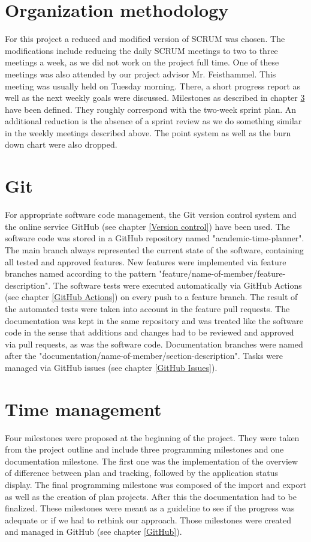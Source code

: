 \section{Organization methodology}
For this project a reduced and modified version of SCRUM \cite{scrum_url} was chosen. The modifications include reducing the daily SCRUM meetings to two to three meetings a week, as we did not work on the project full time. One of these meetings was also attended by our project advisor Mr. Feisthammel. This meeting was usually held on Tuesday morning. There, a short progress report as well as the next weekly goals were discussed. Milestones as described in chapter \ref{Time management} have been defined. They roughly correspond with the two-week sprint plan. An additional reduction is the absence of a sprint review as we do something similar in the weekly meetings described above. The point system as well as the burn down chart were also dropped.

\section{Git}
For appropriate software code management, the Git version control system and the online service GitHub (see chapter \ref{Version control}) have been used. The software code was stored in a GitHub repository named "academic-time-planner". The main branch always represented the current state of the software, containing all tested and approved features. New features were implemented via feature branches named according to the pattern "feature/name-of-member/feature-description". The software tests were executed automatically via GitHub Actions (see chapter \ref{GitHub Actions}) on every push to a feature branch. The result of the automated tests were taken into account in the feature pull requests. The documentation was kept in the same repository and was treated like the software code in the sense that additions and changes had to be reviewed and approved via pull requests, as was the software code. Documentation branches were named after the "documentation/name-of-member/section-description". Tasks were managed via GitHub issues (see chapter \ref{GitHub Issues}).

\section{Time management} \label{Time management}
Four milestones were proposed at the beginning of the project. They were taken from the project outline and include three programming milestones and one documentation milestone. The first one was the implementation of the overview of difference between plan and tracking, followed by the application status display. The final programming milestone was composed of the import and export as well as the creation of plan projects. After this the documentation had to be finalized. These milestones were meant as a guideline to see if the progress was adequate or if we had to rethink our approach. Those milestones were created and managed in GitHub (see chapter \ref{GitHub}). 

